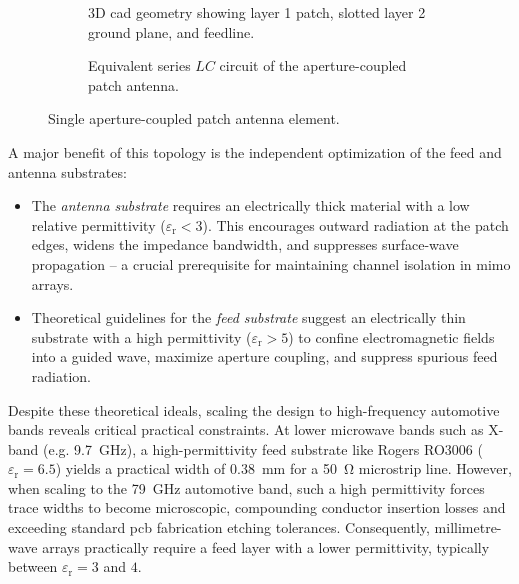 \begin{figure}[!ht]
    \centering
    \begin{subfigure}{0.48\textwidth}
        \centering
        
        \caption{3D \gls{cad} geometry showing layer 1 patch, slotted layer 2 ground plane, and feedline.}
        \label{fig:aperture_coupled_patch_cad}
    \end{subfigure}
    \hfill
    \begin{subfigure}{0.48\textwidth}
        \centering
        
        \caption{Equivalent series $LC$ circuit of the aperture-coupled patch antenna.}
        \label{fig:aperture_coupled_equivalent_circuit}
    \end{subfigure}
    \caption{Single aperture-coupled patch antenna element.}
    \label{fig:aperture_coupled_single_element}
\end{figure}

A major benefit of this topology is the independent optimization of the feed and antenna substrates:
\begin{itemize}
    \item The \textit{antenna substrate} requires an electrically thick material with a low relative permittivity ($\varepsilon_{\mathrm{r}} < 3$).
    This encourages outward radiation at the patch edges, widens the impedance bandwidth, and suppresses surface-wave propagation -- a crucial prerequisite for maintaining channel isolation in \gls{mimo} arrays.
    \item Theoretical guidelines for the \textit{feed substrate} suggest an electrically thin substrate with a high permittivity ($\varepsilon_{\mathrm{r}} > 5$) to confine electromagnetic fields into a guided wave, maximize aperture coupling, and suppress spurious feed radiation.
\end{itemize}

Despite these theoretical ideals, scaling the design to high-frequency automotive bands reveals critical practical constraints.
At lower microwave bands such as X-band (e.g. \qty{9.7}{\giga\hertz}), a high-permittivity feed substrate like Rogers RO3006 ($\varepsilon_{\mathrm{r}} = 6.5$) yields a practical width of \qty{0.38}{\milli\metre} for a \qty{50}{\ohm} microstrip line.
However, when scaling to the \qty{79}{\giga\hertz} automotive band, such a high permittivity forces trace widths to become microscopic, compounding conductor insertion losses and exceeding standard \gls{pcb} fabrication etching tolerances.
Consequently, millimetre-wave arrays practically require a feed layer with a lower permittivity, typically between $\varepsilon_{\mathrm{r}} = 3$ and $4$.

